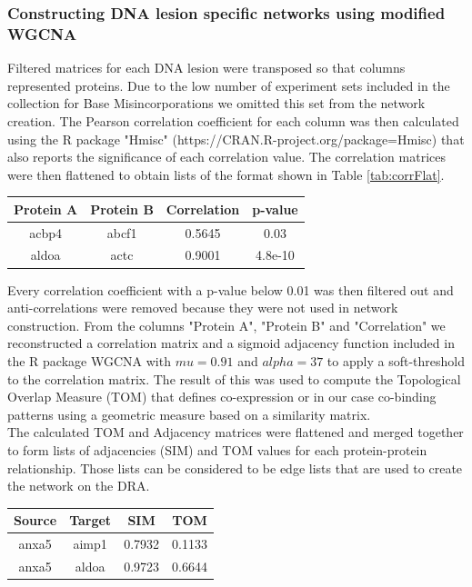 \subsubsection{Constructing DNA lesion specific networks using modified WGCNA}
\label{sec:netprocessing}
Filtered matrices for each DNA lesion were transposed so that columns represented proteins. Due to the low number of experiment sets included in the collection for Base Misincorporations we omitted this set from the network creation. The Pearson correlation coefficient for each column was then calculated using the R package "Hmisc" (https://CRAN.R-project.org/package=Hmisc) that also reports the significance of each correlation value. The correlation matrices were then flattened to obtain lists of the format shown in Table \ref{tab:corrFlat}.
\begin{center}
 \begin{tabular}{c c c c} 
 Protein A & Protein B & Correlation & p-value \\ [0.5ex] 
 \hline
 acbp4 & abcf1 & 0.5645 & 0.03 \\ 
 aldoa & actc & 0.9001 & 4.8e-10
 \label{tab:corrFlat}
\end{tabular}
\end{center}
Every correlation coefficient with a p-value below 0.01 was then filtered out and anti-correlations were removed because they were not used in network construction. From the columns "Protein A", "Protein B" and "Correlation" we reconstructed a correlation matrix and a sigmoid adjacency function included in the R package WGCNA  \citep{PeterLangfelder.2008} with $mu=0.91$ and $alpha = 37$ to apply a soft-threshold to the correlation matrix. The result of this was used to compute the Topological Overlap Measure (TOM) that defines co-expression or in our case co-binding patterns using a geometric measure based on a similarity matrix.\\
The calculated TOM and Adjacency matrices were flattened and merged together to form lists of adjacencies (SIM) and TOM values for each protein-protein relationship. Those lists can be considered to be edge lists that are used to create the network on the DRA.
\begin{center}
 \begin{tabular}{c c c c} 
 Source & Target & SIM & TOM \\ [0.5ex] 
 \hline
anxa5 & aimp1 & 0.7932 & 0.1133\\
anxa5 & aldoa & 0.9723 & 0.6644
  \label{tab:edgeLists}
\end{tabular}
\end{center}
